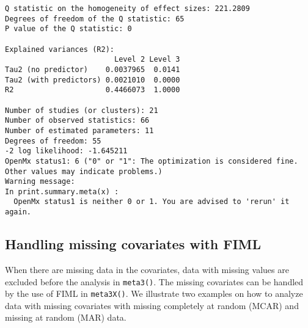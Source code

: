\documentclass[11pt]{article}
\begin{document}
\begin{verbatim}
Q statistic on the homogeneity of effect sizes: 221.2809
Degrees of freedom of the Q statistic: 65
P value of the Q statistic: 0

Explained variances (R2):
                         Level 2 Level 3
Tau2 (no predictor)    0.0037965  0.0141
Tau2 (with predictors) 0.0021010  0.0000
R2                     0.4466073  1.0000

Number of studies (or clusters): 21
Number of observed statistics: 66
Number of estimated parameters: 11
Degrees of freedom: 55
-2 log likelihood: -1.645211 
OpenMx status1: 6 ("0" or "1": The optimization is considered fine.
Other values may indicate problems.)
Warning message:
In print.summary.meta(x) :
  OpenMx status1 is neither 0 or 1. You are advised to 'rerun' it again.
\end{verbatim}

\subsection{Handling missing covariates with FIML}
\label{sec:orge7b84aa}
When there are missing data in the covariates, data with missing values are excluded before the analysis in \texttt{meta3()}. The missing covariates can be handled by the use of FIML in \texttt{meta3X()}. We illustrate two examples on how to analyze data with missing covariates with missing completely at random (MCAR) and missing at random (MAR) data.
\end{document}
